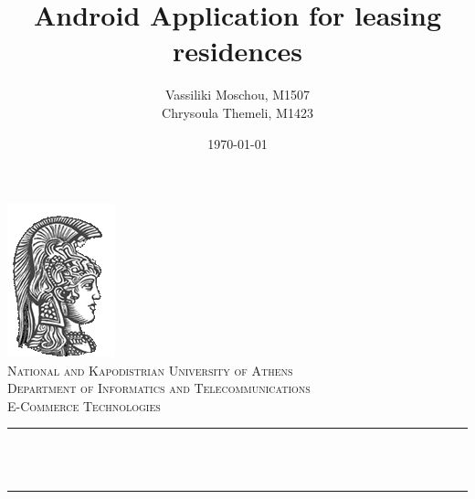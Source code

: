 \documentclass[12pt]{article}
\title{Android Application for leasing residences}
\author{Vassiliki Moschou, M1507 \\
	Chrysoula Themeli, M1423}                               %
\date{\today}                                           %
\makeatletter
\let\thetitle\@title
\let\theauthor\@author
\let\thedate\@date
\makeatother
\begin{document}
	
	
	\begin{titlepage}
		\centering
		\vspace*{0.5 cm}
		\includegraphics[scale = 0.75]{ekpalogo.png}\\[1.0 cm]   %
		\textsc{\LARGE National and Kapodistrian University of Athens}\\[2.0 cm]   %
		\textsc{\Large Department of Informatics and Telecommunications}\\[0.5 cm]               %
		\textsc{\large E-Commerce Technologies}\\[0.5 cm]               %
		\rule{\linewidth}{0.2 mm} \\[0.4 cm]
		{ \huge \bfseries \thetitle}\\
		\rule{\linewidth}{0.2 mm} \\[1.5 cm]
		
		\begin{minipage}{0.4\textwidth}
			\begin{center} \large
				\theauthor
			\end{center}
		\end{minipage}~
		\begin{minipage}{0.4\textwidth}
		\end{minipage}\\[2 cm]
		
		{\large \thedate}\\[2 cm]
		
		\vfill
		
	\end{titlepage}
	
	
	\tableofcontents
	\pagebreak
	
	\listoffigures
	\listoftables
	\newpage
	
	
\end{document}

